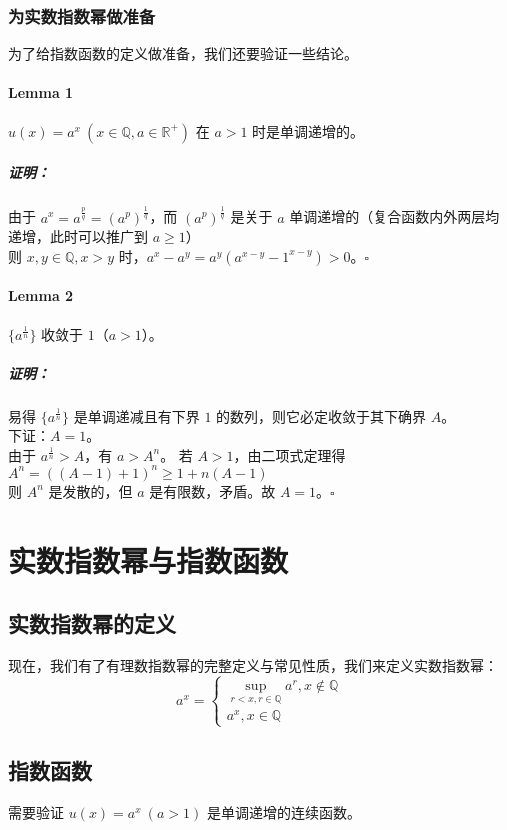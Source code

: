 \documentclass[UTF8,12pt]{ctexart}
\begin{document}
        \subsubsection{为实数指数幂做准备}
            为了给指数函数的定义做准备，我们还要验证一些结论。

            \paragraph{Lemma 1} $u(x) = a^x\ (x \in \mathbb Q, a \in \mathbb R^+)$ 在 $a > 1$ 时是单调递增的。
            \subparagraph{证明：} 由于 $a^x = a^{\frac p q} = (a^p)^{\frac 1 q}$，而 $(a^p)^{\frac 1 q}$ 是关于 $a$ 单调递增的（复合函数内外两层均递增，此时可以推广到 $a \geq 1$）\\
            则 $x, y\in \mathbb Q, x > y$ 时，$a^x - a^y = a^y(a^{x - y} - 1^{x - y}) > 0$。$\square$

            \paragraph{Lemma 2} $\{a^{\frac 1 n}\}$ 收敛于 $1$（$a > 1$）。

            \subparagraph{证明：} 易得 $\{a^{\frac 1 n}\}$ 是单调递减且有下界 $1$ 的数列，则它必定收敛于其下确界 $A$。\\
            下证：$A = 1$。\\
            由于 $a^{\frac 1 n} > A$，有 $a > A^n$。
            若 $A > 1$，由二项式定理得 $A^n = ((A - 1) + 1)^n \geq 1 + n(A - 1)$\\
            则 $A^n$ 是发散的，但 $a$ 是有限数，矛盾。故 $A = 1$。$\square$
        

    
\section{实数指数幂与指数函数}
    \subsection{实数指数幂的定义}
        现在，我们有了有理数指数幂的完整定义与常见性质，我们来定义实数指数幂：
        $$
        a^x = \begin{cases}
            \sup_{r < x, r \in \mathbb Q}a^r, x \notin \mathbb Q\\
            a^x, x \in \mathbb Q
        \end{cases}
        $$
    \subsection{指数函数}
        需要验证 $u(x) = a^x\ (a > 1)$ 是单调递增的连续函数。
\end{document}
